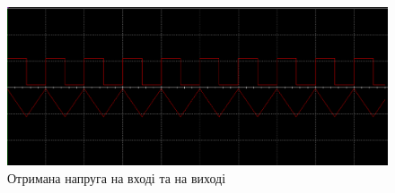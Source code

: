 \begin{figure}[ht]

\centering

\includegraphics[width=0.7\linewidth]{Pic/circuit_3_plot.png}

\caption{Отримана напруга на вході та на виході}

\label{Prac1}

\end{figure}

\newpage
